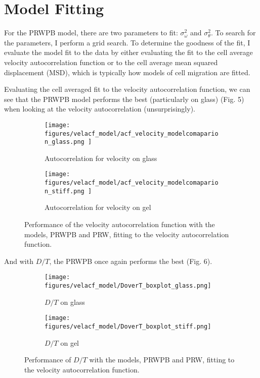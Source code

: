 \documentclass[12pt]{article}
\begin{document}
\section{Model Fitting}
For the PRWPB model, there are two parameters to fit: $\sigma^{2}_{\omega}$ and $\sigma^{2}_{\theta}$. To search for the parameters, I perform a grid search. To determine the goodness of the fit, I evaluate
the model fit to the data by either evaluating the fit to the cell average velocity autocorrelation function or to the cell average mean squared displacement (MSD), which is typically how 
models of cell migration are fitted. 

Evaluating the cell averaged fit to the velocity autocorrelation function, we can see that the PRWPB model performs the best (particularly on glass) (Fig. 5) when looking at the velocity autocorrelation (unsurprisingly).

\begin{figure}[h!]
  \centering
  \begin{subfigure}[b]{0.4\linewidth}
    \texttt{[image: figures/velacf\_model/acf\_velocity\_modelcomaparion\_glass.png ]}
    \caption{Autocorrelation for velocity on glass}
  \end{subfigure}
  \begin{subfigure}[b]{0.4\linewidth}
    \texttt{[image: figures/velacf\_model/acf\_velocity\_modelcomaparion\_stiff.png ]}
    \caption{Autocorrelation for velocity on gel}
  \end{subfigure}
  \caption{Performance of the velocity autocorrelation function with the models, PRWPB and PRW, fitting to the velocity autocorrelation function.}
\end{figure}

And with $D/T$, the PRWPB once again performs the best (Fig. 6).

\begin{figure}[h!]
  \centering
  \begin{subfigure}[b]{0.4\linewidth}
    \texttt{[image: figures/velacf\_model/DoverT\_boxplot\_glass.png]}
    \caption{$D/T$ on glass}
  \end{subfigure}
  \begin{subfigure}[b]{0.4\linewidth}
    \texttt{[image: figures/velacf\_model/DoverT\_boxplot\_stiff.png]}
    \caption{$D/T$ on gel}
  \end{subfigure}
  \caption{Performance of $D/T$ with the models, PRWPB and PRW, fitting to the velocity autocorrelation function.}
\end{figure}
\end{document}

